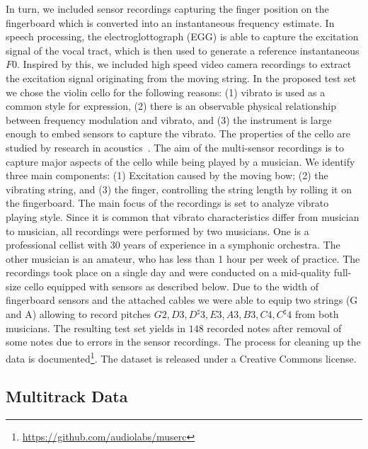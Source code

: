 In turn, we included sensor recordings capturing the finger position on the fingerboard which is converted into an instantaneous frequency estimate. 
In speech processing, the electroglottograph (EGG) is able to capture the excitation signal of the vocal tract, which is then used to generate a reference instantaneous $F0$.
Inspired by this, we included high speed video camera recordings to extract the excitation signal originating from the moving string.
In the proposed test set we chose the violin cello for the following reasons: (1) vibrato is used as a common style for expression, (2) there is an observable physical relationship between frequency modulation and vibrato, and (3) the instrument is large enough to embed sensors to capture the vibrato. The properties of the cello are studied by research in acoustics~\cite{woodhouse04, woodhouse99}.
The aim of the multi-sensor recordings is to capture major aspects of the cello while being played by a musician. We identify three main components: (1) Excitation caused by the moving bow; (2) the vibrating string, and (3) the finger, controlling the string length by rolling it on the fingerboard.
The main focus of the recordings is set to analyze vibrato playing style. Since it is common that vibrato characteristics differ from musician to musician, all recordings were performed by two musicians. One is a professional cellist with 30 years of experience in a symphonic orchestra. 
The other musician is an amateur, who has less than 1 hour per week of practice.
The recordings took place on a single day and were conducted on a mid-quality full-size cello equipped with sensors as described below. Due to the width of fingerboard sensors and the attached cables we were able to equip two strings (G and A) allowing to record pitches ${G2, D3, D^\sharp3, E3, A3, B3, C4, C^\sharp4}$ from both musicians. The resulting test set yields in $148$ recorded notes after removal of some notes due to errors in the sensor recordings. The process for cleaning up the data is documented\footnote{\url{https://github.com/audiolabs/muserc}}. The dataset is released under a Creative Commons license.

\subsection{Multitrack Data}

